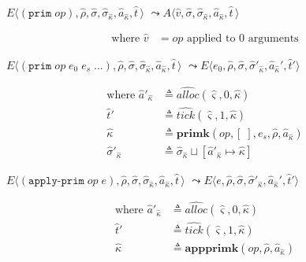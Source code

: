 \documentclass[12pt,draft]{article}
\newcommand{\primsyn}[2]{(\texttt{prim}\;#1\;#2\;...)}
\newcommand{\singleprimsyn}[1]{(\texttt{prim}\;#1)}
\newcommand{\applyprimsyn}[2]{(\texttt{apply-prim}\;#1\;#2)}
\begin{document}
{\begin{multicols*}{2}
\begin{center}
  $E\langle \singleprimsyn{op} , \hat{\rho} , \hat{\sigma} , \hat{\sigma}_{\hat{\kappa}} , \hat{a}_{\hat{\kappa}} , \hat{t}\,\rangle$
  $\leadsto A\langle \hat{v} , \hat{\sigma} , \hat{\sigma}_{\hat{\kappa}} , \hat{a}_{\hat{\kappa}} , \hat{t}\,\rangle$
\end{center}
\vspace{-7mm}
\begin{align*}
\text{where } \hat{v} &= op \text{ applied to } 0 \text{ arguments}
\end{align*}
\begin{center}
  $E\langle \primsyn{op}{e_0\;e_s} , \hat{\rho} , \hat{\sigma} , \hat{\sigma}_{\hat{\kappa}} , \hat{a}_{\hat{\kappa}} , \hat{t}\,\rangle$
  $\leadsto E\langle e_0 , \hat{\rho} , \hat{\sigma} , \hat{\sigma}'_{\hat{\kappa}} , \hat{a}_{\hat{\kappa}}' , \hat{t}'\rangle$
\end{center}
\vspace{-7mm}
\begin{align*}
  \text{where } \hat{a}'_{\hat{\kappa}} &\triangleq \widehat{alloc}(\hat{\varsigma}, 0, \hat{\kappa}) \\
  \hat{t}' &\triangleq \widehat{tick}(\hat{\varsigma}, 1, \hat{\kappa}) \\
  \hat{\kappa} &\triangleq \textbf{primk}(op, [\;], e_s, \hat{\rho}, \hat{a}_{\hat{\kappa}}) \\
  \hat{\sigma}'_{\hat{\kappa}} &\triangleq \hat{\sigma}_{\hat{\kappa}} \sqcup [\hat{a}'_{\hat{\kappa}} \mapsto \hat{\kappa}]
\end{align*}
\begin{center}
  $E\langle \applyprimsyn{op}{e} , \hat{\rho} , \hat{\sigma} , \hat{\sigma}_{\hat{\kappa}} , \hat{a}_{\hat{\kappa}} , \hat{t}\,\rangle$
  $\leadsto E\langle e , \hat{\rho} , \hat{\sigma} , \hat{\sigma}'_{\hat{\kappa}} , \hat{a}_{\hat{\kappa}}' , \hat{t}'\rangle$
\end{center}
\vspace{-7mm}
\begin{align*}
  \text{where } \hat{a}'_{\hat{\kappa}} &\triangleq \widehat{alloc}(\hat{\varsigma}, 0, \hat{\kappa}) \\
  \hat{t}' &\triangleq \widehat{tick}(\hat{\varsigma}, 1, \hat{\kappa}) \\
  \hat{\kappa} &\triangleq \textbf{appprimk}(op, \hat{\rho}, \hat{a}_{\hat{\kappa}}) \\

\end{align*}
\end{multicols*}}
\end{document}
